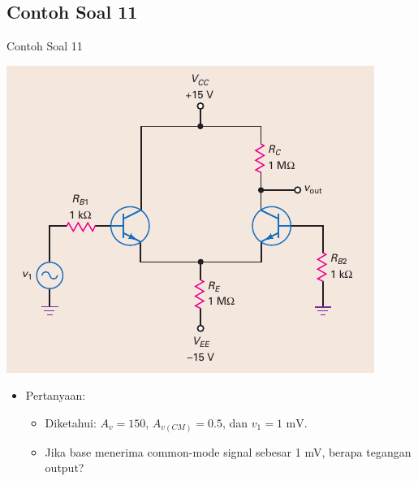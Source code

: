 \documentclass[aspectratio=169]{beamer}
\begin{document}
\subsection{Contoh Soal 11}
\begin{frame}{Contoh Soal 11}
	\begin{multicols}{2}
		\begin{center}
			\includegraphics[height=0.7\textheight]{gambar/01.fig22}
		\end{center}
		\columnbreak
		\begin{itemize}
			\item Pertanyaan:
			\begin{itemize}
				\item Diketahui: $ A_v = 150 $, $ A_{v(CM)} = 0.5 $, dan $ v_1 = 1 \text{ mV} $.
				\item Jika base menerima common-mode signal sebesar 1 mV, berapa tegangan output?
			\end{itemize}
		\end{itemize}
	\end{multicols}
\end{frame}
\end{document}

